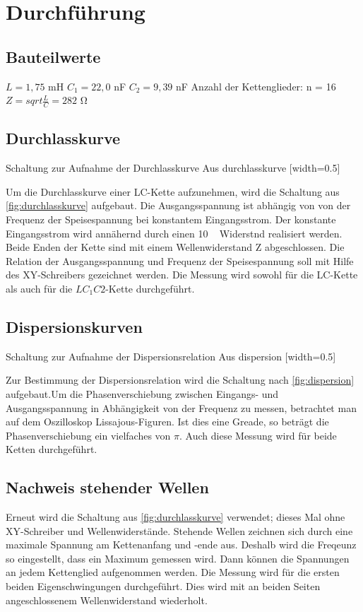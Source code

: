 \section{Durchführung}
\label{sec:Durchführung}

\subsection{Bauteilwerte}
$L = 1,75$ \si{\milli\henry}
$C_{1} = 22,0$ \si{\nano\farad}
$C_{2} = 9,39$ \si{\nano\farad}
Anzahl der Kettenglieder: n = 16
$Z = sqrt{\frac{L}{C}} = 282$ \si{\ohm}

\subsection{Durchlasskurve}

{Schaltung zur Aufnahme der Durchlasskurve Aus \cite{anleitung356}}{durchlasskurve}
[width=0.5\textwidth]

Um die Durchlasskurve einer LC-Kette aufzunehmen, wird die Schaltung aus \ref{fig:durchlasskurve}
aufgebaut. Die Ausgangsspannung ist abhängig von von der Frequenz der Speisespannung bei konstantem Eingangsstrom. Der konstante Eingangsstrom wird annähernd durch einen 10 \si{\kilo\Ohm} Widerstnd realisiert werden. Beide Enden der Kette sind mit einem Wellenwiderstand Z abgeschlossen. Die Relation der Ausgangsspannung und Frequenz der Speisespannung soll mit Hilfe des XY-Schreibers gezeichnet werden.
Die Messung wird sowohl für die LC-Kette als auch für die $LC_{1}C{2}$-Kette durchgeführt.

\subsection{Dispersionskurven}

{Schaltung zur Aufnahme der Dispersionsrelation Aus \cite{anleitung356}}{dispersion}
[width=0.5\textwidth]

Zur Bestimmung der Dispersionsrelation wird die Schaltung nach \ref{fig:dispersion} aufgebaut.Um die Phasenverschiebung zwischen Eingangs- und Ausgangsspannung in Abhängigkeit von der Frequenz zu messen, betrachtet man auf dem Oszilloskop Lissajous-Figuren. Ist dies eine Greade, so beträgt die Phasenverschiebung ein vielfaches von $\pi$. Auch diese Messung wird für beide Ketten durchgeführt.

\subsection{Nachweis stehender Wellen}
Erneut wird die Schaltung aus \ref{fig:durchlasskurve} verwendet; dieses Mal ohne XY-Schreiber und Wellenwiderstände. Stehende Wellen zeichnen sich durch eine maximale Spannung am Kettenanfang und -ende aus. Deshalb wird die Freqeunz so eingestellt, dass ein Maximum gemessen wird. Dann können die Spannungen an jedem Kettenglied aufgenommen werden. Die Messung wird für die ersten beiden Eigenschwingungen durchgeführt.
Dies wird mit an beiden Seiten angeschlossenem Wellenwiderstand wiederholt.
